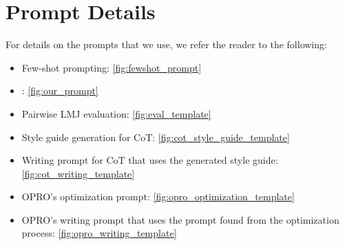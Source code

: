 \section{Prompt Details}
\label{appdx:prompt_details}

For details on the prompts that we use, we refer the reader to the following: 

\begin{itemize}
    \item Few-shot prompting: \autoref{fig:fewshot_prompt}
    \item \ours: \autoref{fig:our_prompt}
    \item Pairwise LMJ evaluation: \autoref{fig:eval_template}
    \item Style guide generation for CoT: \autoref{fig:cot_style_guide_template}
    \item Writing prompt for CoT that uses the generated style guide: \autoref{fig:cot_writing_template}
    \item OPRO's optimization prompt: \autoref{fig:opro_optimization_template}
    \item  OPRO's writing prompt that uses the prompt found from the optimization process: \autoref{fig:opro_writing_template}
\end{itemize}




